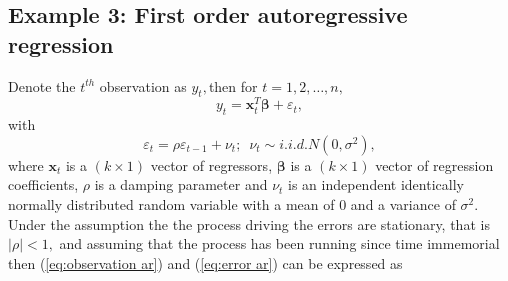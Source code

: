 \documentclass[article]{jss}
\begin{document}
\subsection{Example 3: First order autoregressive regression}
\label{sub:Example-3:-First}

Denote the $t^{th}$ observation as $y_{t},$then for
$t=1,2,\dots,n,$\begin{equation}
  y_{t}=\bm{x}_{t}^{T}\bm{\beta}+\varepsilon_{t},\label{eq:observation
    ar}\end{equation} with\begin{equation}
  \varepsilon_{t}=\rho\varepsilon_{t-1}+\nu_{t};\,\,\,\nu_{t}\sim
  i.i.d.N(0,\sigma^{2}),\label{eq:error ar}\end{equation} where
\textbf{$\bm{x}_{t}$} is a $\left(k\times1\right)$ vector of
regressors, $\bm{\beta}$ is a $\left(k\times1\right)$ vector of
regression coefficients, $\rho$ is a damping parameter and $\nu_{t}$
is an independent identically normally distributed random variable
with a mean of 0 and a variance of $\sigma^{2}.$ Under the assumption
the the process driving the errors are stationary, that is $|\rho|<1,$
and assuming that the process has been running since time immemorial
then (\ref{eq:observation ar}) and (\ref{eq:error ar}) can be
expressed as
\end{document}
